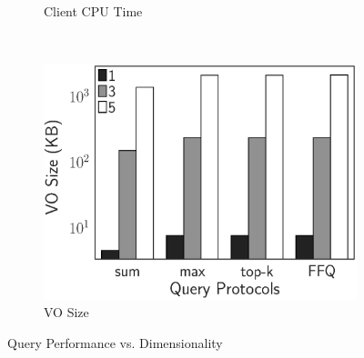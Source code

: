 \begin{figure}[t]
\begin{subfigure}[b]{.33\linewidth}
    \caption{Client CPU Time}
  \end{subfigure}~%
  \begin{subfigure}[b]{.33\linewidth}
    \centering
    \includegraphics[width=\linewidth]{exp-figs/aggregate-queries/dimension_vo.eps}
    \caption{VO Size}
  \end{subfigure}
  \caption{Query Performance vs. Dimensionality}\label{fig:aggregate-queries:md}


\end{figure}
